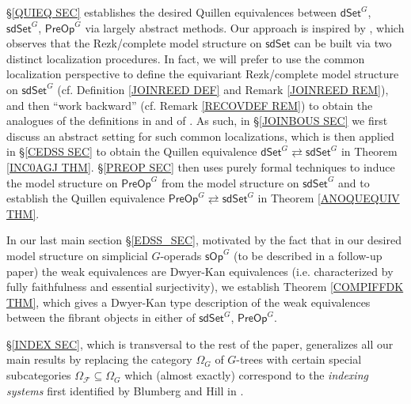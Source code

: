 \documentclass[a4paper,10pt
 ,draft
]{article}%
\begin{document}
\S \ref{QUIEQ SEC} establishes the desired Quillen equivalences between 
$\mathsf{dSet}^G$, $\mathsf{sdSet}^G$, $\mathsf{PreOp}^G$
via largely abstract methods.
Our approach is inspired by 
\cite[Thm. 6.6]{CM13a}, which observes that the Rezk/complete model structure on $\mathsf{sdSet}$ can be built via two distinct localization procedures.
In fact, we will prefer to use the common localization perspective to define the equivariant Rezk/complete model structure on $\mathsf{sdSet}^G$ (cf. Definition \ref{JOINREED DEF} and Remark \ref{JOINREED REM}),
and then ``work backward'' (cf. Remark \ref{RECOVDEF REM}) to obtain the analogues of the definitions in \cite{CM13a} and of \cite[Thm. 6.6]{CM13a}.
%
As such, in \S \ref{JOINBOUS SEC} we first discuss an abstract setting for such common
localizations,
which is then applied in \S \ref{CEDSS SEC} to obtain
the Quillen equivalence
$\mathsf{dSet}^G \rightleftarrows \mathsf{sdSet}^G$
in Theorem \ref{INC0AGJ THM}.
\S \ref{PREOP SEC} then uses purely formal techniques to induce the model structure on
$\mathsf{PreOp}^G$ from the model structure on
$\mathsf{sdSet}^G$
and to establish the Quillen equivalence
$\mathsf{PreOp}^G \rightleftarrows \mathsf{sdSet}^G$
in Theorem \ref{ANOQUEQUIV THM}.

In our last main section \S \ref{EDSS_SEC},
motivated by the fact that in our desired model structure on simplicial $G$-operads $\mathsf{sOp}^G$
(to be described in a follow-up paper)
the weak equivalences are Dwyer-Kan equivalences
(i.e. characterized by fully faithfulness and essential surjectivity), 
we establish Theorem \ref{COMPIFFDK THM}, which gives a Dwyer-Kan type description of the weak equivalences 
between the fibrant objects in either of $\mathsf{sdSet}^G$, $\mathsf{PreOp}^G$.

\S \ref{INDEX SEC}, which is transversal to the rest of the paper, generalizes all our main results by replacing the category $\Omega_G$ of $G$-trees
with certain special subcategories
$\Omega_{\mathcal{F}} \subseteq \Omega_G$
which (almost exactly) correspond to the 
\textit{indexing systems} first identified
by Blumberg and Hill in \cite{BH15}.
\end{document}
